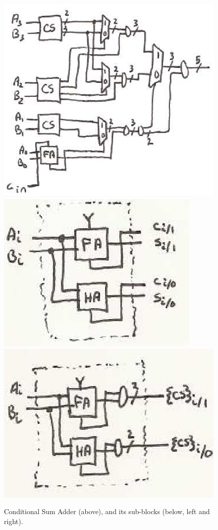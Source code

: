 \begin{figure}
\caption{Conditional Sum Adder (above), and its sub-blocks (below, left and right).}\label{f-cond_sum_add}
\begin{center}
\includegraphics{conditional_sum.eps}\\\vspace{.2in}
\includegraphics{cs_4out.eps} \hspace{.2in} \includegraphics{cs_2out.eps}
\end{center}
\end{figure}


